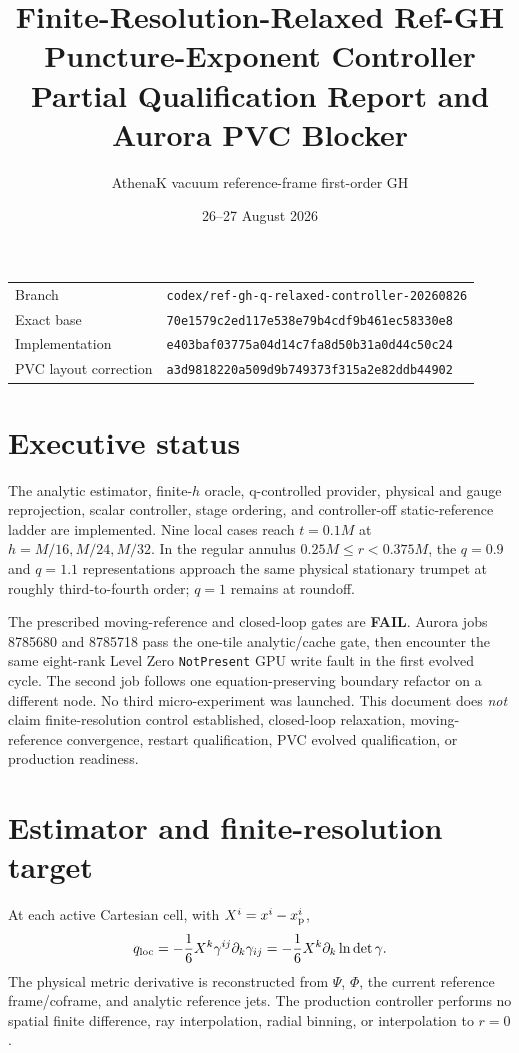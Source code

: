 \documentclass[10pt]{article}
\title{Finite-Resolution-Relaxed Ref-GH Puncture-Exponent Controller\\
\large Partial Qualification Report and Aurora PVC Blocker}
\author{AthenaK vacuum reference-frame first-order GH}
\date{26--27 August 2026}
\newcommand{\Fail}{\textcolor{fail}{\textbf{FAIL}}}
\newcommand{\code}[1]{\texttt{#1}}
\begin{document}
\maketitle

\begin{tabularx}{\textwidth}{@{}lX@{}}
Branch & \code{codex/ref-gh-q-relaxed-controller-20260826}\\
Exact base & \code{70e1579c2ed117e538e79b4cdf9b461ec58330e8}\\
Implementation & \code{e403baf03775a04d14c7fa8d50b31a0d44c50c24}\\
PVC layout correction & \code{a3d9818220a509d9b749373f315a2e82ddb44902}\\
\end{tabularx}

\section{Executive status}

The analytic estimator, finite-$h$ oracle, q-controlled provider, physical and
gauge reprojection, scalar controller, stage ordering, and controller-off
static-reference ladder are implemented.  Nine local cases reach $t=0.1M$ at
$h=M/16,M/24,M/32$.  In the regular annulus
$0.25M\leq r<0.375M$, the $q=0.9$ and $q=1.1$ representations approach the same
physical stationary trumpet at roughly third-to-fourth order; $q=1$ remains at
roundoff.

The prescribed moving-reference and closed-loop gates are \Fail.  Aurora jobs
8785680 and 8785718 pass the one-tile analytic/cache gate, then encounter the
same eight-rank Level Zero \code{NotPresent} GPU write fault in the first evolved
cycle.  The second job follows one equation-preserving boundary refactor on a
different node.  No third micro-experiment was launched.  This document does
\emph{not} claim finite-resolution control established, closed-loop
relaxation, moving-reference convergence, restart qualification, PVC evolved
qualification, or production readiness.

\section{Estimator and finite-resolution target}

At each active Cartesian cell, with $X^i=x^i-x^i_{\rm p}$,
\begin{equation}
q_{\rm loc}=-\frac16 X^k\gamma^{ij}\partial_k\gamma_{ij}
           =-\frac16 X^k\partial_k\ln\det\gamma.
\end{equation}
The physical metric derivative is reconstructed from $\Psi$, $\Phi$, the
current reference frame/coframe, and analytic reference jets.  The production
controller performs no spatial finite difference, ray interpolation, radial
binning, or interpolation to $r=0$.
\end{document}
